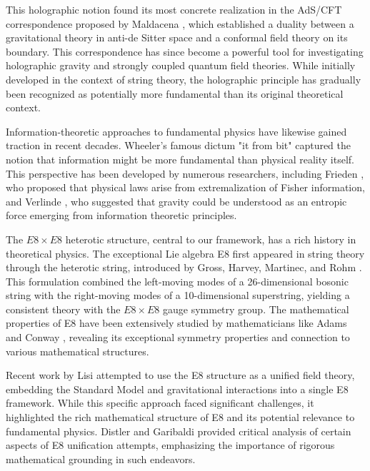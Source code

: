 \documentclass[11pt,english,twoside]{article}
\begin{document}
This holographic notion found its most concrete realization in the AdS/CFT correspondence proposed by Maldacena \cite{Maldacena1999}, which established a duality between a gravitational theory in anti-de Sitter space and a conformal field theory on its boundary. This correspondence has since become a powerful tool for investigating holographic gravity and strongly coupled quantum field theories. While initially developed in the context of string theory, the holographic principle has gradually been recognized as potentially more fundamental than its original theoretical context.

Information-theoretic approaches to fundamental physics have likewise gained traction in recent decades. Wheeler's famous dictum "it from bit" \cite{Wheeler1990} captured the notion that information might be more fundamental than physical reality itself. This perspective has been developed by numerous researchers, including Frieden \cite{Frieden1998}, who proposed that physical laws arise from extremalization of Fisher information, and Verlinde \cite{Verlinde2011}, who suggested that gravity could be understood as an entropic force emerging from information theoretic principles.

The $E8\times E8$ heterotic structure, central to our framework, has a rich history in theoretical physics. The exceptional Lie algebra E8 first appeared in string theory through the heterotic string, introduced by Gross, Harvey, Martinec, and Rohm \cite{Gross1985a}. This formulation combined the left-moving modes of a 26-dimensional bosonic string with the right-moving modes of a 10-dimensional superstring, yielding a consistent theory with the $E8\times E8$ gauge symmetry group. The mathematical properties of E8 have been extensively studied by mathematicians like Adams \cite{Adams1996} and Conway \cite{Conway1998}, revealing its exceptional symmetry properties and connection to various mathematical structures.

Recent work by Lisi \cite{Lisi2007} attempted to use the E8 structure as a unified field theory, embedding the Standard Model and gravitational interactions into a single E8 framework. While this specific approach faced significant challenges, it highlighted the rich mathematical structure of E8 and its potential relevance to fundamental physics. Distler and Garibaldi \cite{Distler2010} provided critical analysis of certain aspects of E8 unification attempts, emphasizing the importance of rigorous mathematical grounding in such endeavors.
\end{document}

